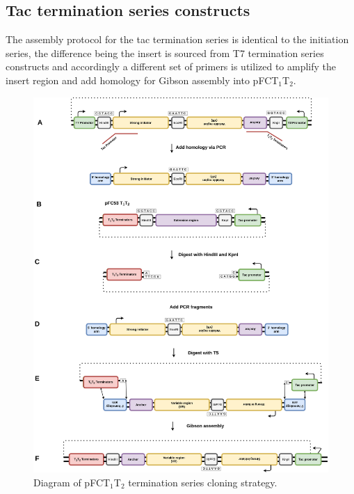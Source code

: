 \documentclass[11pt]{article}
\begin{document}
\subsection{Tac termination series constructs}
\label{sec:tac-termination}

The assembly protocol for the tac termination series is identical to the initiation series, the difference being the insert is sourced from T7 termination series constructs and accordingly a different set of primers is utilized to amplify the insert region and add homology for Gibson assembly into 
pFCT$_1$T$_2$.

\begin{figure}[H]
	\includegraphics[width=15cm]{images/cloning_diagrams/construct_diagrams-Tac-termination-series.png}
	\centering
	\caption{Diagram of pFCT$_1$T$_2$ termination series cloning strategy.}
\end{figure}
\end{document}
